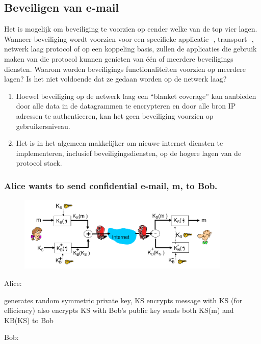 \subsection{Beveiligen van e-mail}

Het is mogelijk om beveiliging te voorzien op eender welke van de top vier lagen. Wanneer beveiliging wordt voorzien voor een specifieke applicatie -, transport -, netwerk laag protocol of op een koppeling basis, zullen de applicaties die gebruik maken van die protocol kunnen genieten van één of meerdere beveiligings diensten.
Waarom worden beveiligings functionaliteiten voorzien op meerdere lagen? Is het niet voldoende dat ze gedaan worden op de netwerk laag?
\begin{enumerate}
    \item	Hoewel beveiliging op de netwerk laag een “blanket coverage” kan aanbieden door alle data in de datagrammen te encrypteren en door alle bron IP adressen te authenticeren, kan het geen beveiliging voorzien op gebruikersniveau.
    \item Het is in het algemeen makkelijker om nieuwe internet diensten te implementeren,
    inclusief beveiligingsdiensten, op de hogere lagen van de protocol stack.
\end{enumerate}

\subsubsection{Alice wants to send confidential e-mail, m, to Bob.}

\begin{figure}[h]
    \centering
    \includegraphics[width=4in]{./img/imghfdst8/hfdst8puntje23.png}
    \caption{ }      
    \label{fig: }
\end{figure}

\noindent Alice:

\bi
\itf generates random symmetric private key, KS
\itf encrypts message with KS  (for efficiency)
\itf also encrypts KS with Bob’s public key
\itf sends both KS(m) and KB(KS) to Bob
\ei

\noindent Bob:


